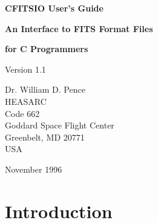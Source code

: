 %
\oddsidemargin=0.25in
\evensidemargin=0.00in
\textwidth=6.0in
\topmargin=0.0in
\textheight=8.75in
\parindent=0cm
\parskip=0.2cm


\begin{titlepage}
\normalsize
\vspace*{4.0cm}
\begin{center}
{\Huge \bf CFITSIO User's Guide}\\
\end{center}
\medskip 
\medskip 
\begin{center}
{\LARGE \bf An Interface to FITS Format Files}\\
\end{center}
\begin{center}
{\LARGE \bf for C Programmers}\\
\end{center}
\medskip
\medskip
\begin{center}
{\Large Version 1.1\\}
\end{center}
\bigskip
\vskip 3.0cm
\begin{center}
{Dr. William D. Pence\\
HEASARC\\
Code 662\\
Goddard Space Flight Center\\
Greenbelt, MD 20771\\
USA}
\end{center}

\vfill
\bigskip
\begin{center}
{\Large November 1996\\}
\end{center}
\vfill
\end{titlepage}

\begin{titlepage}
\vspace*{7.6cm}
\vfill
\end{titlepage}


\tableofcontents

\chapter{Introduction }

